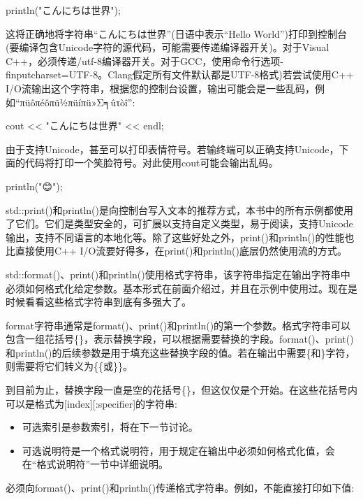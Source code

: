 \begin{cpp}
println("こんにちは世界");
\end{cpp}

这将正确地将字符串“こんにちは世界”(日语中表示“Hello World”)打印到控制台(要编译包含Unicode字符的源代码，可能需要传递编译器开关)。对于Visual C++，必须传递/utf-8编译器开关。对于GCC，使用命令行选项-finputcharset=UTF-8。Clang假定所有文件默认都是UTF-8格式)若尝试使用C++ I/O流输出这个字符串，根据您的控制台设置，输出可能会是一些乱码，例如“πüôπéôπü½πüíπü»Σ╕ûτòî”:

\begin{cpp}
cout << "こんにちは世界" << endl;
\end{cpp}

由于支持Unicode，甚至可以打印表情符号。若输终端可以正确支持Unicode，下面的代码将打印一个笑脸符号。对此使用cout可能会输出乱码。

\newfontfamily{}
println("{\emojifont 😊}");

std::print()和println()是向控制台写入文本的推荐方式，本书中的所有示例都使用了它们。它们是类型安全的，可扩展以支持自定义类型，易于阅读，支持Unicode输出，支持不同语言的本地化等。除了这些好处之外，print()和println()的性能也比直接使用C++ I/O流要好得多，在print()和println()底层仍然使用流的方式。


std::format()、print()和println()使用格式字符串，该字符串指定在输出字符串中必须如何格式化给定参数。基本形式在前面介绍过，并且在示例中使用过。现在是时候看看这些格式字符串到底有多强大了。

format字符串通常是format()、print()和println()的第一个参数。格式字符串可以包含一组花括号\{\}，表示替换字段，可以根据需要替换的字段。format()、print()和println()的后续参数是用于填充这些替换字段的值。若在输出中需要\{和\}字符，则需要将它们转义为\{\{或\}\}。

到目前为止，替换字段一直是空的花括号\{\}，但这仅仅是个开始。在这些花括号内可以是格式为[index][:specifier]的字符串:

\begin{itemize}
\item
可选索引是参数索引，将在下一节讨论。

\item
可选说明符是一个格式说明符，用于规定在输出中必须如何格式化值，会在“格式说明符”一节中详细说明。
\end{itemize}

必须向format()、print()和println()传递格式字符串。例如，不能直接打印如下值:

